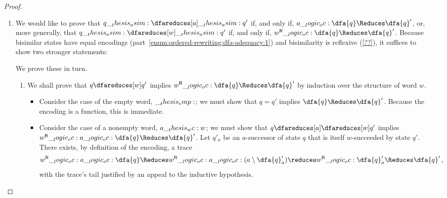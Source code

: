 \begin{proof}
\begin{enumerate}[parsep=0em, listparindent=\parindent]
  \item
    We would like to prove that $q \asim\dfareduces[a]\asim q'$ if, and only if, $a \oc \dfa{q} \Reduces \dfa{q}'$, or, more generally, that $q \asim\dfareduces[w]\asim q'$ if, and only if, $\rev{w} \oc \dfa{q} \Reduces \dfa{q}'$.
    Because bisimilar states have equal encodings (part~\ref{enum:ordered-rewriting:dfa-adequacy:1}) and bisimilarity is reflexive (\cref{??}), it suffices to show two stronger statements:
    We prove these in turn.
    \begin{enumerate}
    \item
      We shall prove that $q \dfareduces[w] q'$ implies $\rev{w} \oc \dfa{q} \Reduces \dfa{q}'$ by induction over the structure of word $w$.
      \begin{itemize}
      \item
        Consider the case of the empty word, $\__thesis_emp:$; we must show that $q = q'$ implies $\dfa{q} \Reduces \dfa{q}'$.
        Because the encoding is a function, this is immediate.
      \item
        Consider the case of a nonempty word, $a \wc w$; we must show that $q \dfareduces[a]\dfareduces[w] q'$ implies $\rev{w} \oc a \oc \dfa{q} \Reduces \dfa{q}'$.
        Let $q'_a$ be an $a$-successor of state $q$ that is itself $w$-succeeded by state $q'$.
        There exists, by definition of the encoding, a trace
        \begin{equation*}
          \rev{w} \oc a \oc \dfa{q}
            \Reduces \rev{w} \oc a \oc (a \limp \dfa{q}'_a)
            \reduces \rev{w} \oc \dfa{q}'_a
            \Reduces \dfa{q}'
          \,,
        \end{equation*}
        with the trace's tail justified by an appeal to the inductive hypothesis.
      \end{itemize}



\end{enumerate}
\end{enumerate}
\end{proof}
